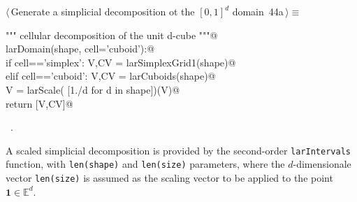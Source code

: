 \documentclass[11pt,oneside]{article}    %
\def\E{\mathbb{E}}
\begin{document}
\begin{flushleft} \small \label{scrap70}
\protect{}$\langle\,$Generate a simplicial decomposition ot the $[0,1]^d$ domain\nobreak\ {\footnotesize 44a}$\,\rangle\equiv$
\vspace{-1ex}
\begin{list}{}{} \item
\mbox{}\verb@""" cellular decomposition of the unit d-cube """@\\
\mbox{}\verb@def larDomain(shape, cell='cuboid'):@\\
\mbox{}\verb@    if cell=='simplex': V,CV = larSimplexGrid1(shape)@\\
\mbox{}\verb@    elif cell=='cuboid': V,CV = larCuboids(shape)@\\
\mbox{}\verb@    V = larScale( [1./d for d in shape])(V)@\\
\mbox{}\verb@    return [V,CV]@\\
\mbox{}\verb@@{\NWsep}
\end{list}
\vspace{-1ex}
\footnotesize\addtolength{\baselineskip}{-1ex}
\begin{list}{}{\setlength{\itemsep}{-\parsep}\setlength{\itemindent}{-\leftmargin}}
\item \NWtxtMacroRefIn\ .
\end{list}
\end{flushleft}

A scaled simplicial decomposition is provided by the second-order  \texttt{larIntervals} function, with \texttt{len(shape)} and \texttt{len(size)} parameters, where the $d$-dimensionale vector \texttt{len(size)} is assumed as the scaling vector to be applied to the point $\mathbf{1}\in\E^d$.
\end{document}
